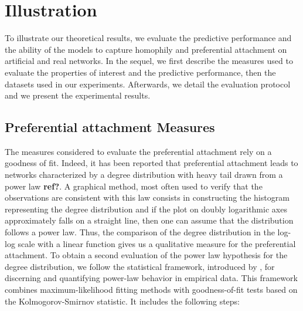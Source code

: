 \section{Illustration}

To illustrate our theoretical results, we evaluate the predictive performance and the ability of the models to capture homophily and preferential attachment on artificial and real networks. In the sequel, we first describe the measures used to evaluate the properties of interest and the predictive performance, then the datasets used in our experiments. Afterwards, we detail the evaluation protocol and we present the experimental results.


\subsection{Preferential attachment Measures}
\label{sec:experiments-burst}

The measures considered to evaluate the preferential attachment rely on a goodness of fit. Indeed, it has been reported that preferential attachment leads to networks characterized by a degree distribution with heavy tail drawn from a power law \textbf{ref?}. A graphical method, most often used to verify that the observations are consistent with this law  consists in constructing the histogram representing the degree distribution and if the plot on doubly logarithmic axes approximately falls on a straight line, then one can assume that the distribution follows a power law. Thus, the comparison of the degree distribution in the log-log scale with a linear function gives us a qualitative measure for the preferential attachment. To obtain a second evaluation of the power law hypothesis for the degree distribution, we follow the statistical framework, introduced by \cite{clauset2009power}, for discerning and quantifying power-law behavior in empirical data. This framework combines maximum-likelihood fitting methods with goodness-of-fit tests based on the Kolmogorov-Smirnov statistic. It includes the following steps:


